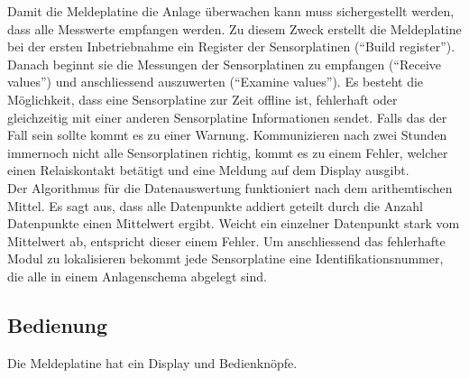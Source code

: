 \newpage
Damit die Meldeplatine die Anlage überwachen kann muss sichergestellt werden, dass alle Messwerte empfangen werden. Zu diesem Zweck erstellt die Meldeplatine bei der ersten Inbetriebnahme ein Register der Sensorplatinen (``Build register''). Danach beginnt sie die Messungen der Sensorplatinen zu empfangen (``Receive values'') und anschliessend auszuwerten (``Examine values''). Es besteht die Möglichkeit, dass eine Sensorplatine zur Zeit offline ist, fehlerhaft oder gleichzeitig mit einer anderen Sensorplatine Informationen sendet. Falls das der Fall sein sollte kommt es zu einer Warnung. Kommunizieren nach zwei Stunden immernoch nicht alle Sensorplatinen richtig, kommt es zu einem Fehler, welcher einen Relaiskontakt betätigt und eine Meldung auf dem Display ausgibt.\\
Der Algorithmus für die Datenauswertung funktioniert nach dem arithemtischen Mittel. Es sagt aus, dass alle Datenpunkte addiert geteilt durch die Anzahl Datenpunkte einen Mittelwert ergibt. Weicht ein einzelner Datenpunkt stark vom Mittelwert ab, entspricht dieser einem Fehler. Um anschliessend das fehlerhafte Modul zu lokalisieren bekommt jede Sensorplatine eine Identifikationsnummer, die alle in einem Anlagenschema abgelegt sind.

\subsection{Bedienung}
Die Meldeplatine hat ein Display und Bedienknöpfe. 
%